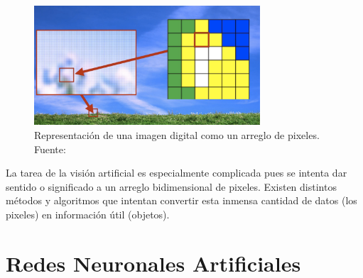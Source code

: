     \begin{figure}[!h] 
        \centering
        \includegraphics[width=0.75\textwidth]{img/digitalimg}
        \caption{Representación de una imagen digital como un arreglo de pixeles. Fuente: \cite{Szeliski2011} }
        \label{fig:digitalimg}
    \end{figure}

    La tarea de la visión artificial es especialmente complicada pues se intenta dar sentido o significado a un arreglo bidimensional 
    de pixeles. Existen distintos métodos y algoritmos que intentan convertir esta inmensa cantidad de datos (los pixeles) en 
    información útil (objetos).

\section{Redes Neuronales Artificiales}         %

